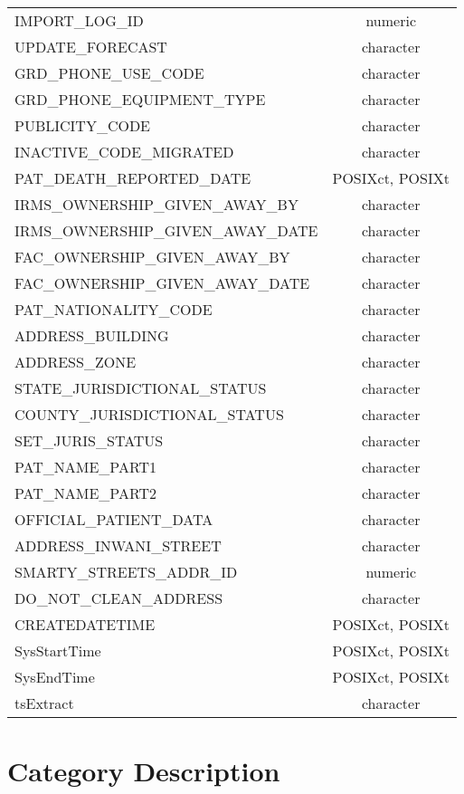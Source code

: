 \documentclass[
  letterpaper,
  DIV=11,
  numbers=noendperiod]{scrreprt}
\begin{document}
\begin{longtable}{lc}
IMPORT\_LOG\_ID & numeric \\ 
UPDATE\_FORECAST & character \\ 
GRD\_PHONE\_USE\_CODE & character \\ 
GRD\_PHONE\_EQUIPMENT\_TYPE & character \\ 
PUBLICITY\_CODE & character \\ 
INACTIVE\_CODE\_MIGRATED & character \\ 
PAT\_DEATH\_REPORTED\_DATE & POSIXct, POSIXt \\ 
IRMS\_OWNERSHIP\_GIVEN\_AWAY\_BY & character \\ 
IRMS\_OWNERSHIP\_GIVEN\_AWAY\_DATE & character \\ 
FAC\_OWNERSHIP\_GIVEN\_AWAY\_BY & character \\ 
FAC\_OWNERSHIP\_GIVEN\_AWAY\_DATE & character \\ 
PAT\_NATIONALITY\_CODE & character \\ 
ADDRESS\_BUILDING & character \\ 
ADDRESS\_ZONE & character \\ 
STATE\_JURISDICTIONAL\_STATUS & character \\ 
COUNTY\_JURISDICTIONAL\_STATUS & character \\ 
SET\_JURIS\_STATUS & character \\ 
PAT\_NAME\_PART1 & character \\ 
PAT\_NAME\_PART2 & character \\ 
OFFICIAL\_PATIENT\_DATA & character \\ 
ADDRESS\_INWANI\_STREET & character \\ 
SMARTY\_STREETS\_ADDR\_ID & numeric \\ 
DO\_NOT\_CLEAN\_ADDRESS & character \\ 
CREATEDATETIME & POSIXct, POSIXt \\ 
SysStartTime & POSIXct, POSIXt \\ 
SysEndTime & POSIXct, POSIXt \\ 
tsExtract & character \\ 
\bottomrule
\end{longtable}

\hypertarget{category-description-27}{%
\section*{Category Description}\label{category-description-27}}
\end{document}
